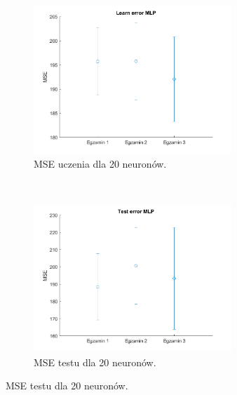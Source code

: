 \documentclass[12pt]{article}
\begin{document}
\begin{figure}[H]
\centering
\begin{subfigure}[t]{0.48\textwidth} 
\centering
\includegraphics[height=2.2in]{purelin_purelin_20_learn.png}
\caption{MSE uczenia dla 20 neuronów.}
\end{subfigure}
~~
\begin{subfigure}[t]{0.48\textwidth} 
\centering
\includegraphics[height=2.2in]{purelin_purelin_20_test.png}
\caption{MSE testu dla 20 neuronów.}
\end{subfigure}


\end{figure}
\end{document}
